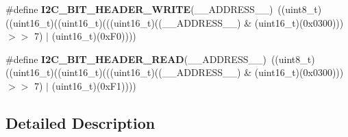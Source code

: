 \begin{DoxyCompactItemize}
\item 
\hypertarget{group___i2_c___private___macro_ga0edd591eaa2ce5511148bf1ebf533e1a}{\#define {\bfseries I2\-C\-\_\-B\-I\-T\-\_\-\-H\-E\-A\-D\-E\-R\-\_\-\-W\-R\-I\-T\-E}(\-\_\-\-\_\-\-A\-D\-D\-R\-E\-S\-S\-\_\-\-\_\-)~((uint8\-\_\-t)((uint16\-\_\-t)((uint16\-\_\-t)(((uint16\-\_\-t)((\-\_\-\-\_\-\-A\-D\-D\-R\-E\-S\-S\-\_\-\-\_\-) \& (uint16\-\_\-t)(0x0300))) $>$$>$ 7) $\vert$ (uint16\-\_\-t)(0x\-F0))))}\label{group___i2_c___private___macro_ga0edd591eaa2ce5511148bf1ebf533e1a}

\item 
\hypertarget{group___i2_c___private___macro_ga8d833802aafa40a959f62965e498108c}{\#define {\bfseries I2\-C\-\_\-B\-I\-T\-\_\-\-H\-E\-A\-D\-E\-R\-\_\-\-R\-E\-A\-D}(\-\_\-\-\_\-\-A\-D\-D\-R\-E\-S\-S\-\_\-\-\_\-)~((uint8\-\_\-t)((uint16\-\_\-t)((uint16\-\_\-t)(((uint16\-\_\-t)((\-\_\-\-\_\-\-A\-D\-D\-R\-E\-S\-S\-\_\-\-\_\-) \& (uint16\-\_\-t)(0x0300))) $>$$>$ 7) $\vert$ (uint16\-\_\-t)(0x\-F1))))}\label{group___i2_c___private___macro_ga8d833802aafa40a959f62965e498108c}

\end{DoxyCompactItemize}


\subsection{Detailed Description}



